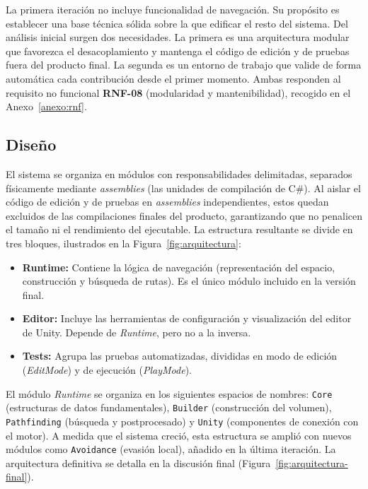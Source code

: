 La primera iteración no incluye funcionalidad de navegación.
Su propósito es establecer una base técnica sólida sobre la que edificar el resto del sistema.
Del análisis inicial surgen dos necesidades. La primera es una arquitectura modular que favorezca el desacoplamiento y mantenga el código de edición y de pruebas fuera del producto final. La segunda es un entorno de trabajo que valide de forma automática cada contribución desde el primer momento.
Ambas responden al requisito no funcional \textbf{RNF-08} (modularidad y mantenibilidad), recogido en el Anexo~\ref{anexo:rnf}.

\subsection{Diseño}

El sistema se organiza en módulos con responsabilidades delimitadas, separados físicamente mediante \textit{assemblies} (las unidades de compilación de C\#).
Al aislar el código de edición y de pruebas en \textit{assemblies} independientes, estos quedan excluidos de las compilaciones finales del producto, garantizando que no penalicen el tamaño ni el rendimiento del ejecutable.
La estructura resultante se divide en tres bloques, ilustrados en la Figura~\ref{fig:arquitectura}:

\begin{itemize}
    \item \textbf{Runtime:} Contiene la lógica de navegación (representación del espacio, construcción y búsqueda de rutas).
    Es el único módulo incluido en la versión final.
    \item \textbf{Editor:} Incluye las herramientas de configuración y visualización del editor de Unity.
    Depende de \textit{Runtime}, pero no a la inversa.
    \item \textbf{Tests:} Agrupa las pruebas automatizadas, divididas en modo de edición (\textit{EditMode}) y de ejecución (\textit{PlayMode}).
\end{itemize}

El módulo \textit{Runtime} se organiza en los siguientes espacios de nombres: \texttt{Core} (estructuras de datos fundamentales), \texttt{Builder} (construcción del volumen), \texttt{Pathfinding} (búsqueda y postprocesado) y \texttt{Unity} (componentes de conexión con el motor).
A medida que el sistema creció, esta estructura se amplió con nuevos módulos como \texttt{Avoidance} (evasión local), añadido en la última iteración.
La arquitectura definitiva se detalla en la discusión final (Figura~\ref{fig:arquitectura-final}).

